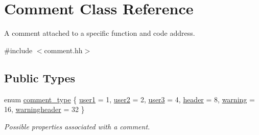 \hypertarget{class_comment}{}\section{Comment Class Reference}
\label{class_comment}


A comment attached to a specific function and code address.  




{\ttfamily \#include $<$comment.\+hh$>$}

\subsection*{Public Types}
\begin{DoxyCompactItemize}
\item 
enum \mbox{\hyperlink{class_comment_a25e5457bf3deeb109bdef2f532317cf2}{comment\+\_\+type}} \{ \newline
\mbox{\hyperlink{class_comment_a25e5457bf3deeb109bdef2f532317cf2a597a18796f40173c4386df4bfa43c5f6}{user1}} = 1, 
\mbox{\hyperlink{class_comment_a25e5457bf3deeb109bdef2f532317cf2ab185eb126ed99dc5f4ef44cd10c7afe9}{user2}} = 2, 
\mbox{\hyperlink{class_comment_a25e5457bf3deeb109bdef2f532317cf2a16887a18cc49d182634a3b940f5a5b23}{user3}} = 4, 
\mbox{\hyperlink{class_comment_a25e5457bf3deeb109bdef2f532317cf2a4f427f6f23e685093fa39c7c639a8fd6}{header}} = 8, 
\newline
\mbox{\hyperlink{class_comment_a25e5457bf3deeb109bdef2f532317cf2a2166c8f68c37806afa4c67052b04b51e}{warning}} = 16, 
\mbox{\hyperlink{class_comment_a25e5457bf3deeb109bdef2f532317cf2a22b7847860fc380835ca045cc01af9ee}{warningheader}} = 32
 \}
\begin{DoxyCompactList}\small\item\em Possible properties associated with a comment. \end{DoxyCompactList}\end{DoxyCompactItemize}
